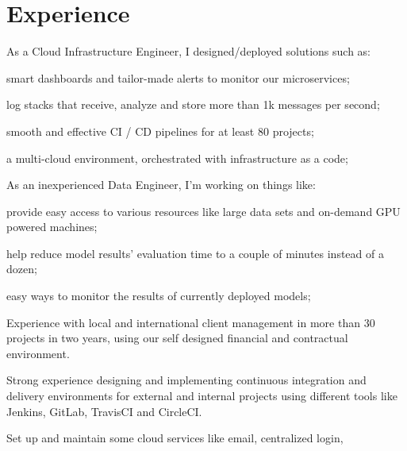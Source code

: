 \documentclass[]{deedy-resume-openfont}
\begin{document}
\begin{minipage}[t]{0.66\textwidth}
    \section{Experience}
    As a Cloud Infrastructure Engineer, I designed/deployed solutions such as:
    \vspace{\topsep} %
    \begin{tightemize}
      \item smart dashboards and tailor-made alerts to monitor our microservices;
      \item log stacks that receive, analyze and store more than 1k messages per second;
      \item smooth and effective CI / CD pipelines for at least 80 projects;
      \item a multi-cloud environment, orchestrated with infrastructure as a code;
    \end{tightemize}
    As an inexperienced Data Engineer, I'm working on things like:
    \begin{tightemize}
      \item provide easy access to various resources like large data sets and on-demand GPU powered machines;
      \item help reduce model results' evaluation time to a couple of minutes instead of a dozen;
      \item easy ways to monitor the results of currently deployed models;
    \end{tightemize}
    \begin{tightemize}
    \item Experience with local and international client management in more
        than 30 projects in two years, using our self designed financial and
        contractual environment.
    \item Strong experience designing and implementing continuous integration
        and delivery environments for external and internal projects using
        different tools like Jenkins, GitLab, TravisCI and CircleCI.
    \item Set up and maintain some cloud services like email, centralized login,

\end{tightemize}
\end{minipage}
\end{document}
